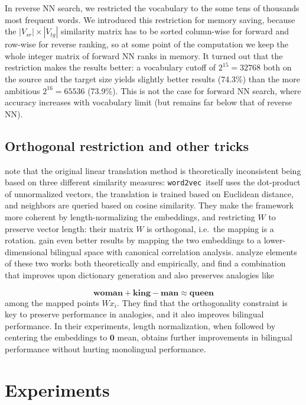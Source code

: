 \documentclass[11pt]{article}
\begin{document}
In reverse NN search, we restricted the vocabulary to the some tens of
thousands most frequent words. We introduced this restriction for memory
saving, because the $|V_{sr}|\times|V_{tg}|$ similarity matrix has
to be sorted column-wise for forward and row-wise for reverse ranking, so at
some point of the computation we keep the whole integer matrix of forward NN
ranks in memory. It turned out that the restriction makes the results better: a
vocabulary cutoff of $2^{15}=32768$ both on the source and the target size
yields slightly better results (74.3\%) than the more ambitious $2^{16}=65536$
(73.9\%). This is not the case for forward NN search, where accuracy increases
with vocabulary limit (but remains far below that of reverse NN).

\subsection{Orthogonal restriction and other tricks}

\newcommand{\wordtovec}{\texttt{word2vec}}

\cite{Xing:2015} note that the original linear translation method is
theoretically inconsistent being based on three different similarity measures:
\wordtovec~itself uses the dot-product of unnormalized vectors, the translation
is trained based on Euclidean distance, and neighbors are queried based on
cosine similarity. They make the framework more coherent by length-normalizing
the embeddings, and restricting $W$ to preserve vector length: their matrix
$W$ is orthogonal, i.e.~the mapping is a rotation.  \cite{Faruqui:2014} gain
even better results by mapping the two embeddings to a lower-dimensional
bilingual space with canonical correlation analysis.  \cite{Artetxe:2016}
analyze elements of these two works both theoretically and empirically, and
find a combination that improves upon dictionary generation and also preserves
analogies \citep{Mikolov:2013l} like

\[\mathbf{woman} + \mathbf{king}- \mathbf{man}  \approx \mathbf{queen}\]
among the mapped points $Wx_i$. They find that the
orthogonality constraint is key to preserve performance in analogies, and it
also improves bilingual performance.  In their experiments, length
normalization, when followed by centering the embeddings to $\mathbf 0$ mean,
obtains further improvements in bilingual performance without hurting
monolingual performance.

\section{Experiments}
\label{sec:exper}
\end{document}
